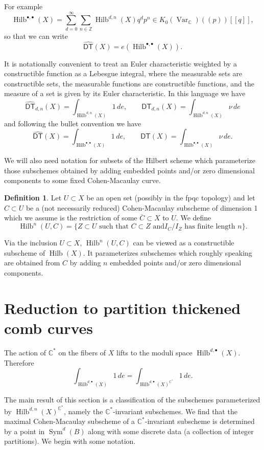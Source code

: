 \documentclass[12pt]{amsart}
\theoremstyle{definition}
\newtheorem{definition}[theorem]{Definition}
\newcommand{\CC} {\mathbb{C}}          %
\newcommand{\ZZ} {\mathbb{Z}}		%
\newcommand{\Sym}{\operatorname{Sym}}
\newcommand{\Hilb}{\operatorname{Hilb}}
\newcommand{\DT}{\mathsf{DT}}
\newcommand{\Var}{\operatorname{Var}}
\newcommand{\DThat}{\widehat{\DT}}
\begin{document}
For example
\[
\Hilb^{\bullet ,\bullet}(X) = \sum_{d=0}^{\infty}\sum_{n\in \ZZ}
\Hilb^{d,n}(X) q^{d}p^{n}\in K_{0}(\Var_{\CC})(\!(p)\!)[[q]],
\]
so that we can write
\[
\DThat (X) = e(\Hilb^{\bullet ,\bullet}(X)).
\]

It is notationally convenient to treat an Euler characteristic
weighted by a constructible function as a Lebesgue integral, where the
measurable sets are constructible sets, the measurable functions are
constructible functions, and the measure of a set is given by its
Euler characteristic. In this language we have
\[
\DThat_{d ,n}(X) =  \int_{\Hilb^{d ,n}(X)} 1\, de, \quad \quad
\DT_{d ,n}(X) = \int_{\Hilb^{d ,n}(X)} \nu \, de
\]
and following the bullet convention we have
\[
\DThat(X) =  \int_{\Hilb^{\bullet ,\bullet }(X)} 1\, de, \quad \quad
\DT(X) = \int_{\Hilb^{\bullet ,\bullet }(X)} \nu \, de.
\]

We will also need notation for subsets of the Hilbert scheme which
parameterize those subschemes obtained by adding embedded points
and/or zero dimensional components to
some fixed Cohen-Macaulay curve.

\begin{definition}\label{defn: Hilb(U,C)}
Let $U\subset X$ be an open set (possibly in the fpqc topology) and
let $C\subset U$ be a (not necessarily reduced)
Cohen-Macaulay subscheme of dimension 1 which we assume is the
restriction of some $\overline{C}\subset X$ to $U$. We define 
\[
\Hilb^{n}(U,C) = \{Z\subset U\text{ such that }C\subset Z\text{ and
$I_{C}/I_{Z}$ has finite length $n$} \}.
\]
\end{definition}
Via the inclusion $U\subset X$, $\Hilb^{n}(U,C)$ can be viewed as a
constructible subscheme of $\Hilb (X)$. It parameterizes subschemes
which roughly speaking are obtained from $C$ by adding $n$ embedded
points and/or zero dimensional components.

\section{Reduction to partition thickened comb curves}\label{sec: reduction to thickened comb curves}

The action of $\CC^*$ on the fibers of $X$ lifts to the moduli space
$\Hilb^{d,\bullet}(X)$. Therefore
$$
\int_{\Hilb^{d,\bullet}(X)} 1 \, de = \int_{\Hilb^{d,\bullet}(X)^{\CC^*}} 1 \, de.
$$

The main result of this section is a classification of the subschemes
parameterized by $\Hilb^{d,n}(X)^{\CC^{*}}$, namely the
$\CC^{*}$-invariant subschemes.  We find that the maximal
Cohen-Macaulay subscheme of a $\CC^{*}$-invariant subscheme is
determined by a point in $\Sym^{d}(B)$ along with some discrete data
(a collection of integer partitions). We begin with some notation.
\end{document}
